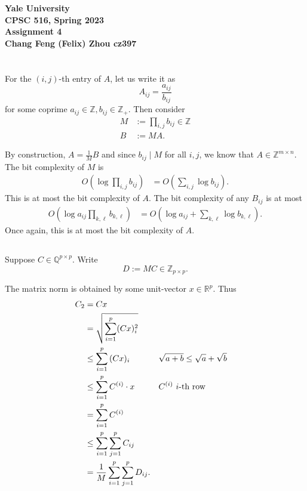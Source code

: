 \documentclass[10pt]{article}
\let\abs\relax
\DeclarePairedDelimiter{\abs}{\lvert}{\rvert}
\let\norm\relax
\DeclarePairedDelimiter{\norm}{\lVert}{\rVert}
\newcommand{\R}{\mathbb{R}}
\newcommand{\Z}{\mathbb{Z}}
\newcommand{\Q}{\mathbb{Q}}
\begin{document}
\begin{center}
    {\Large\textbf{Yale University}}\\
    \vspace{3mm}
    {\Large\textbf{CPSC 516, Spring 2023}}\\
    \vspace{2mm}
    {\Large\textbf{Assignment 4}}\\
    \vspace{3mm}
    \textbf{Chang Feng (Felix) Zhou cz397}
\end{center}

\section{}
\subsection{}
For the $(i, j)$-th entry of $A$,
let us write it as
\[
  A_{ij} = \frac{a_{ij}}{b_{ij}}
\]
for some coprime $a_{ij}\in \Z, b_{ij}\in \Z_+$.
Then consider
\begin{align*}
  M &:= \prod_{i, j} b_{ij}\in \Z \\
  B &:= MA.
\end{align*}

By construction,
$A = \frac1M B$
and since $b_{ij}\mid M$ for all $i, j$,
we know that $A\in \Z^{m\times n}$.
The bit complexity of $M$ is
\begin{align*}
  O\left( \log \prod_{i, j} b_{ij} \right)
  &= O\left( \sum_{i, j} \log b_{ij} \right).
\end{align*}
This is at most the bit complexity of $A$.
The bit complexity of any $B_{ij}$ is at most
\begin{align*}
  O\left( \log a_{ij} \prod_{k, \ell} b_{k, \ell} \right)
  &= O\left( \log a_{ij} + \sum_{k, \ell} \log b_{k, \ell} \right).
\end{align*}
Once again,
this is at most the bit complexity of $A$.

\subsection{}
Suppose $C\in \Q^{p\times p}$.
Write
\[
  D := M C\in \Z_{p\times p}.
\]

The matrix norm is obtained by some unit-vector $x\in \R^p$.
Thus
\begin{align*}
  \norm{C}_2
  &= \norm{Cx} \\
  &= \sqrt{\sum_{i=1}^p (Cx)_i^2} \\
  &\leq \sum_{i=1}^p \abs{(Cx)_i} &&\sqrt{a+b}\leq \sqrt a + \sqrt b \\
  &\leq \sum_{i=1}^p \norm{C^{(i)}}\cdot \norm{x} &&\text{$C^{(i)}$ $i$-th row} \\
  &= \sum_{i=1}^p \norm{C^{(i)}} \\
  &\leq \sum_{i=1}^p \sum_{j=1}^p \abs{C_{ij}} \\
  &= \frac1M \sum_{i=1}^p \sum_{j=1}^p \abs{D_{ij}}.
\end{align*}
\end{document}
